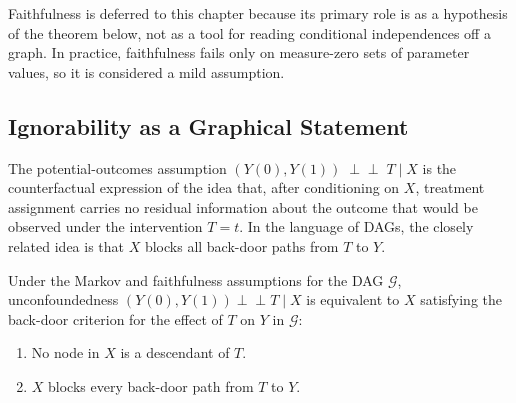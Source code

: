 \documentclass[
  a4paper,
]{book}
\providecommand{\tightlist}{%
  \setlength{\itemsep}{0pt}\setlength{\parskip}{0pt}}
\newcommand{\indep}{\perp\!\!\!\perp}
\newcommand{\Gcal}{\mathcal{G}}
\begin{document}
Faithfulness is deferred to this chapter because its primary role is as
a hypothesis of the theorem below, not as a tool for reading conditional
independences off a graph. In practice, faithfulness fails only on
measure-zero sets of parameter values, so it is considered a mild
assumption.

\subsection{Ignorability as a Graphical
Statement}\label{ignorability-as-a-graphical-statement}

The potential-outcomes assumption \((Y(0), Y(1)) \;\indep\; T \mid X\)
is the counterfactual expression of the idea that, after conditioning on
\(X\), treatment assignment carries no residual information about the
outcome that would be observed under the intervention \(T{=}t\). In the
language of DAGs, the closely related idea is that \(X\) blocks all
back-door paths from \(T\) to \(Y\).

\begin{tcolorbox}[enhanced jigsaw, arc=.35mm, bottomrule=.15mm, bottomtitle=1mm, breakable, colback=white, colbacktitle=quarto-callout-tip-color!10!white, colframe=quarto-callout-tip-color-frame, coltitle=black, left=2mm, leftrule=.75mm, opacityback=0, opacitybacktitle=0.6, rightrule=.15mm, title={Theorem: Ignorability \(\Leftrightarrow\) Back-Door Criterion}, titlerule=0mm, toprule=.15mm, toptitle=1mm]

Under the Markov and faithfulness assumptions for the DAG \(\Gcal\),
unconfoundedness \((Y(0), Y(1)) \indep T \mid X\) is equivalent to \(X\)
satisfying the back-door criterion for the effect of \(T\) on \(Y\) in
\(\Gcal\):

\begin{enumerate}
\def\labelenumi{\arabic{enumi}.}
\tightlist
\item
  No node in \(X\) is a descendant of \(T\).
\item
  \(X\) blocks every back-door path from \(T\) to \(Y\).
\end{enumerate}

\end{tcolorbox}
\end{document}
